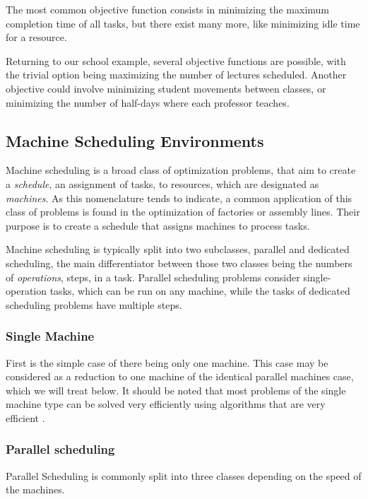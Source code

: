 \documentclass{mimosis}
\begin{document}
The most common objective function consists in minimizing the maximum completion time of all tasks, but there exist many more, like minimizing idle time for a resource.

Returning to our school example, several objective functions are possible, with the trivial option being maximizing the number of lectures scheduled. Another objective could involve minimizing student movements between classes, or minimizing the number of half-days where each professor teaches.

\subsection{Machine Scheduling Environments} %

Machine scheduling is a broad class of optimization problems, that aim to create a \emph{schedule}, an assignment of tasks, to resources, which are designated as \emph{machines}. As this nomenclature tends to indicate, a common application of this class of problems is found in the optimization of factories or assembly lines. Their purpose is to create a schedule that assigns machines to process tasks. 

Machine scheduling is typically split into two subclasses, parallel and dedicated scheduling, the main differentiator between those two classes being the numbers of \emph{operations}, steps, in a task. Parallel scheduling problems consider single-operation tasks, which can be run on any machine, while the tasks of dedicated scheduling problems have multiple steps.

\subsubsection{Single Machine}

First is the simple case of there being only one machine. This case may be considered as a reduction to one machine of the identical parallel machines case, which we will treat below. It should be noted that most problems of the single machine type can be solved very efficiently using algorithms that are very efficient \citep{lawler1993sequencing}.

\subsubsection{Parallel scheduling}
Parallel Scheduling is commonly split into three classes depending on the speed of the machines. 
\end{document}
